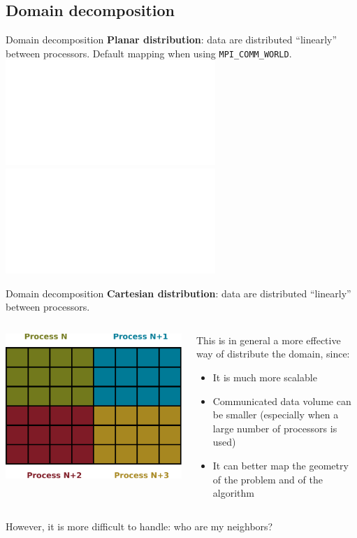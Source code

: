 \documentclass[aspectratio=43]{beamer}
\begin{document}
\subsection{Domain decomposition}
\begin{frame}[fragile]{Domain decomposition}
\textbf{Planar distribution}: data are distributed “linearly” between processors.
Default mapping when using \verb+MPI_COMM_WORLD+.\\
\includegraphics<1>[scale=0.5]{05.MPI_Topo/decomp1.pdf}
\includegraphics<2>[scale=0.5]{05.MPI_Topo/decomp1gc.pdf}
\end{frame}

\begin{frame}[fragile]{Domain decomposition}
\textbf{Cartesian distribution}: data are distributed “linearly” between processors.
\vspace{0.5cm}
\begin{columns}
\begin{column}{0.322\paperwidth}
\includegraphics[scale=0.4]{05.MPI_Topo/decomp2.pdf}
\end{column}
\begin{column}{0.5\paperwidth}
This is in general a more effective way of distribute the domain, since:
\begin{itemize}
\item It is much more scalable
\item Communicated data volume can be smaller (especially when a large number of processors is used)
\item It can better map the geometry of the problem and of the algorithm
\end{itemize}
\end{column}
\end{columns}
\vspace{0.5cm}
However, it is more difficult to handle: who are my neighbors?
\end{frame}
\end{document}
